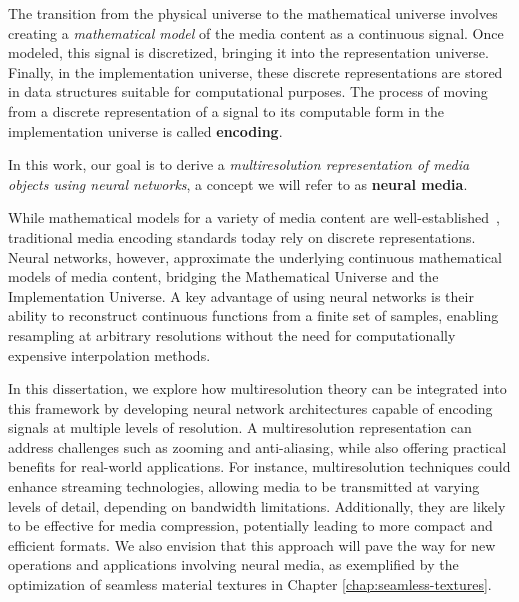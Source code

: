 The transition from the physical universe to the mathematical universe involves creating a \textit{mathematical model} of the media content as a continuous signal. Once modeled, this signal is discretized, bringing it into the representation universe. Finally, in the implementation universe, these discrete representations are stored in data structures suitable for computational purposes. The process of moving from a discrete representation of a signal to its computable form in the implementation universe is called \textbf{encoding}. 


In this work, our goal is to derive a \textit{multiresolution representation of media objects using neural networks}, a concept we will refer to as \textbf{neural media}. 


While mathematical models for a variety of media content are well-established~\citep{ ipcgVelho2014, wenger2013isosurfaces}, traditional media encoding standards today rely on discrete representations. Neural networks, however, approximate the underlying continuous mathematical models of media content, bridging the Mathematical Universe and the Implementation Universe. A key advantage of using neural networks is their ability to reconstruct continuous functions from a finite set of samples, enabling resampling at arbitrary resolutions without the need for computationally expensive interpolation methods.

In this dissertation, we explore how multiresolution theory can be integrated into this framework by developing neural network architectures capable of encoding signals at multiple levels of resolution. A multiresolution representation can address challenges such as zooming and anti-aliasing, while also offering practical benefits for real-world applications. For instance, multiresolution techniques could enhance streaming technologies, allowing media to be transmitted at varying levels of detail, depending on bandwidth limitations. Additionally, they are likely to be effective for media compression, potentially leading to more compact and efficient formats. We also envision that this approach will pave the way for new operations and applications involving neural media, as exemplified by the optimization of seamless material textures in Chapter \ref{chap:seamless-textures}. 



